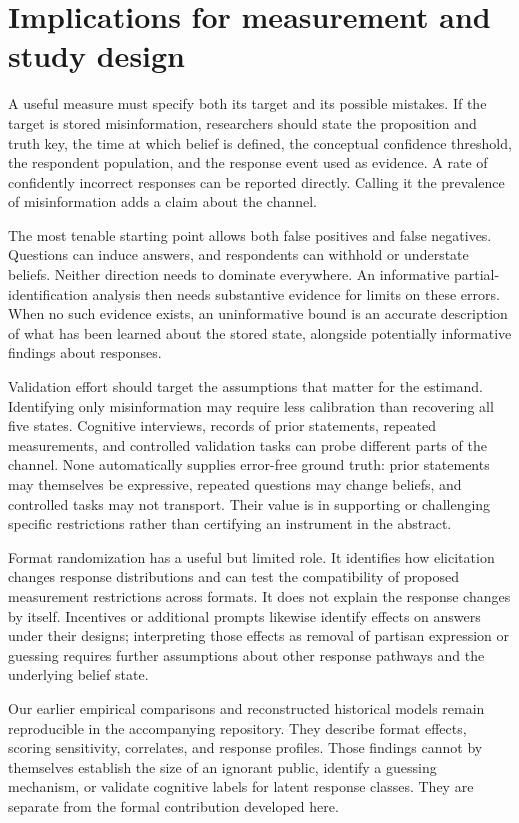 \documentclass[11pt]{article}
\begin{document}
\section{Implications for measurement and study design}

A useful measure must specify both its target and its possible mistakes. If the target is stored misinformation, researchers should state the proposition and truth key, the time at which belief is defined, the conceptual confidence threshold, the respondent population, and the response event used as evidence. A rate of confidently incorrect responses can be reported directly. Calling it the prevalence of misinformation adds a claim about the channel.

The most tenable starting point allows both false positives and false negatives. Questions can induce answers, and respondents can withhold or understate beliefs. Neither direction needs to dominate everywhere. An informative partial-identification analysis then needs substantive evidence for limits on these errors. When no such evidence exists, an uninformative bound is an accurate description of what has been learned about the stored state, alongside potentially informative findings about responses.

Validation effort should target the assumptions that matter for the estimand. Identifying only misinformation may require less calibration than recovering all five states. Cognitive interviews, records of prior statements, repeated measurements, and controlled validation tasks can probe different parts of the channel. None automatically supplies error-free ground truth: prior statements may themselves be expressive, repeated questions may change beliefs, and controlled tasks may not transport. Their value is in supporting or challenging specific restrictions rather than certifying an instrument in the abstract.

Format randomization has a useful but limited role. It identifies how elicitation changes response distributions and can test the compatibility of proposed measurement restrictions across formats. It does not explain the response changes by itself. Incentives or additional prompts likewise identify effects on answers under their designs; interpreting those effects as removal of partisan expression or guessing requires further assumptions about other response pathways and the underlying belief state.

Our earlier empirical comparisons and reconstructed historical models remain reproducible in the accompanying repository. They describe format effects, scoring sensitivity, correlates, and response profiles. Those findings cannot by themselves establish the size of an ignorant public, identify a guessing mechanism, or validate cognitive labels for latent response classes. They are separate from the formal contribution developed here.
\end{document}
